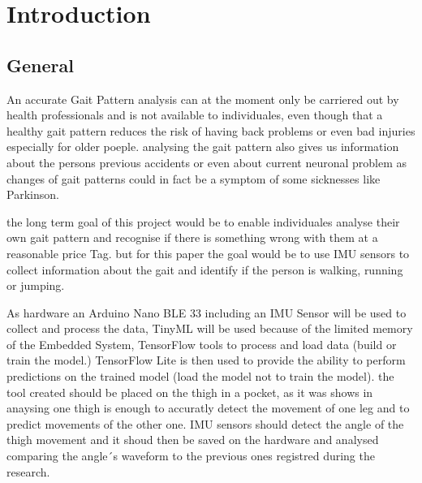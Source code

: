 %
%

\chapter{Introduction}

\section{General}

An accurate Gait Pattern analysis can at the moment only be carriered out by health professionals  and is not available to individuales, even though that a healthy gait pattern reduces the risk of having back problems or even bad injuries especially for older poeple. 
analysing the gait pattern also gives us information about the persons previous accidents or even about current neuronal problem as changes of gait patterns could in fact be a symptom of some sicknesses like Parkinson.

the long term goal of this project would be to enable individuales analyse their own gait pattern and recognise if there is something wrong with them at a reasonable price Tag. 
but for this paper the goal would be to use IMU sensors to collect information about the gait and identify if the person is walking, running or jumping.

As  hardware an Arduino Nano BLE 33  including an IMU Sensor will be used to collect and process the data, TinyML will be used because of the limited memory of the Embedded System, TensorFlow tools to process and load data (build or train the model.) TensorFlow Lite is then used to provide the ability to perform predictions on the trained model (load the model not to train the model). 
the tool created should be placed on the thigh in a pocket, as it was shows in \cite{AbhayasingheMurray:2014} anaysing one thigh is enough to accuratly detect the movement of one leg and to predict movements of the other one. IMU sensors should detect the angle of the thigh movement and it shoud then be saved on the hardware and analysed comparing the angle´s waveform to the previous ones registred during the research.\\

